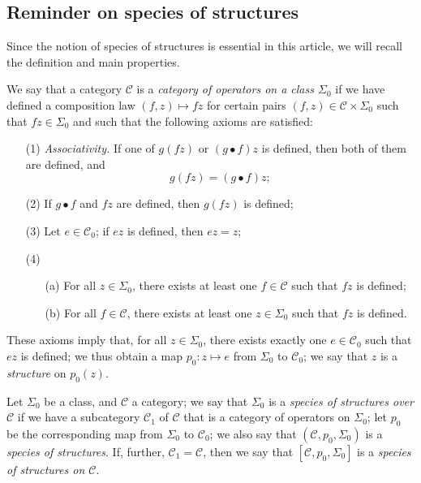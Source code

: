 \documentclass[a4paper,fleqn]{article}
\theoremstyle{plain}
\theoremstyle{definition}
\newenvironment{definition}[1]
  {\renewcommand\theinnerdefinition{#1}\innerdefinition}
  {\endinnerdefinition}
\newcommand{\CC}{\mathcal{C}}
\newcommand{\smallbullet}{\bullet}
\begin{document}
\subsection{Reminder on species of structures}
\label{section:i.2}

Since the notion of species of structures \cite{3a} is essential in this article, we will recall the definition and main properties.

\begin{definition}{1}
\label{definition:i-1}
  We say that a category $\CC$ is a \emph{category of operators on a class $\Sigma_0$} if we have defined a composition law $(f,z)\mapsto fz$ for certain pairs $(f,z)\in\CC\times\Sigma_0$ such that $fz\in\Sigma_0$ and such that the following axioms are satisfied:
  \begin{enumerate}
    \item[\normalfont(1)]
      \emph{Associativity.}
      If one of $g(fz)$ or $(g\smallbullet f)z$ is defined, then both of them are defined, and
      \[
        g(fz)
        = (g\smallbullet f)z;
      \]
    \item[\normalfont(2)]
      If $g\smallbullet f$ and $fz$ are defined, then $g(fz)$ is defined;
    \item[\normalfont(3)]
      Let $e\in\CC_0$;
      if $ez$ is defined, then $ez=z$;
    \item[\normalfont(4)]
      \begin{enumerate}
        \item[(a)]
          For all $z\in\Sigma_0$, there exists at least one $f\in\CC$ such that $fz$ is defined;
        \item[(b)]
          For all $f\in\CC$, there exists at least one $z\in\Sigma_0$ such that $fz$ is defined.
      \end{enumerate}
  \end{enumerate}
\end{definition}

These axioms imply that, for all $z\in\Sigma_0$, there exists exactly one $e\in\CC_0$ such that $ez$ is defined;
we thus obtain a map $p_0\colon z\mapsto e$ from $\Sigma_0$ to $\CC_0$;
we say that $z$ is a \emph{structure} on $p_0(z)$.

\begin{definition}{2}
\label{definition:i-2}
  Let $\Sigma_0$ be a class, and $\CC$ a category;
  we say that $\Sigma_0$ is a \emph{species of structures over $\CC$} if we have a subcategory $\CC_1$ of $\CC$ that is a category of operators on $\Sigma_0$;
  let $p_0$ be the corresponding map from $\Sigma_0$ to $\CC_0$;
  we also say that $(\CC,p_0,\Sigma_0)$ is a \emph{species of structures}.
  If, further, $\CC_1=\CC$, then we say that $[\CC,p_0,\Sigma_0]$ is a \emph{species of structures on $\CC$}.
\end{definition}
\end{document}
